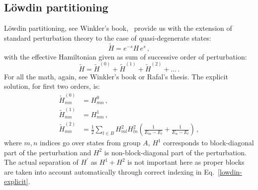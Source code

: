 \documentclass[10pt, onecolumn, aps, prb, superscriptaddress, floatfix, showpacs, notitlepage]{revtex4-1}
\begin{document}
\subsection{L\"owdin partitioning}
L\"owdin partitioning, see Winkler's book,~\cite{winkler} provide us with the extension of standard perturbation theory to the case of quasi-degenerate states:
\begin{equation}
\tilde{H} = e^{-s} H \, e^{s}\,,
\end{equation}
with the effective Hamiltonian given as sum of successive order of perturbation:
\begin{equation}
\tilde{H} = \tilde{H}^{(0)} + \tilde{H}^{(1)} + \tilde{H}^{(2)} + \ldots\,.
\end{equation}
For all the math, again, see Winkler's book or Rafal's thesis.
The explicit solution, for first two orders, is:
\begin{subequations}
\label{lowdin-explicit}
\begin{align}
    \tilde{H}^{(0)}_{mn} &= H^0_{mn} \,,\\
    \tilde{H}^{(1)}_{mn} &= H^1_{mn} \,,\\
    \tilde{H}^{(2)}_{mn} &= \frac{1}{2} \sum_{l\in B}
    H^{2}_{m l} H^{2}_{l n}
    \left(\frac{1}{E_m - E_l} + \frac{1}{E_n - E_l}\right)\,,
\end{align}
\end{subequations}
where $m, n$ indices go over states from group $A$, $H^{1}$ corresponds to block-diagonal part of the perturbation and $H^{2}$ is non-block-diagonal part of the perturbation.
The actual separation of $H^{\prime}$ as $H^{1}+H^{2}$ is not important here as proper blocks are taken into account automatically through correct indexing in Eq.~\eqref{lowdin-explicit}.
\end{document}
